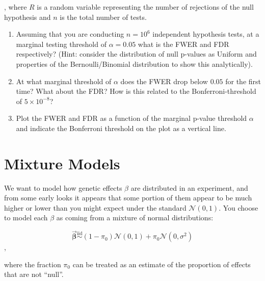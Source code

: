 \documentclass{pset}
\begin{document}
, where $R$ is a random variable representing the number of rejections of the null hypothesis and $n$ is the total number of tests. 

\begin{enumerate}
\item Assuming that you are conducting $n=10^6$ independent hypothesis tests, at a marginal testing threshold of $\alpha = 0.05$ what is the FWER and FDR respectively?  (Hint: consider the distribution of null p-values as Uniform and properties of the Bernoulli/Binomial distribution to show this analytically).

\item At what marginal threshold of $\alpha$ does the FWER drop below $0.05$ for the first time? What about the FDR? How is this related to the Bonferroni-threshold of $5\times 10^{-8}$? 

\item Plot the FWER and FDR as a function of the marginal p-value threshold $\alpha$ and indicate the Bonferroni threshold on the plot as a vertical line.

\end{enumerate}

\newpage 
\section*{Mixture Models}

We want to model how genetic effects $\beta$ are distributed in an experiment, and from some early looks it appears that some portion of them appear to be much higher or lower than you might expect under the standard $\mathcal{N}(0,1)$. You choose to model each $\beta$ as coming from a mixture of normal distributions:

$$\overrightarrow{\mathbf{\beta}} \overset{\text{iid}}{\sim} (1 - \pi_0) \mathcal{N}(0, 1) + \pi_0\mathcal{N}(0,\sigma^2)$$, 

where the fraction $\pi_0$ can be treated as an estimate of the proportion of effects that are not ``null''.
\end{document}
